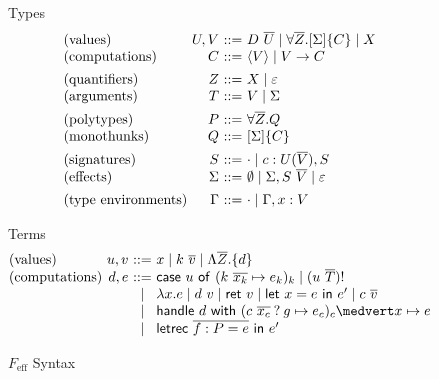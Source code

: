 \documentclass[preprint]{sigplanconf}
\makeatletter
\newcommand{\feff}{$F_\textrm{eff}$\xspace}
\newcommand{\many}{\overline}
\newcommand\ba{\begin{array}}
\newcommand\ea{\end{array}}
\newenvironment{equations}{\[\ba{@{}r@{~}c@{~}l@{}}}{\ea\]}
\newenvironment{syntax}{\[\ba{@{}l@{~}r@{~}c@{~}l@{}}}{\ea\]}
\newcommand{\rt}[1]{\langle{#1}\rangle}   %
\newcommand{\sig}{S}
\newcommand{\sigs}{\Sigma}
\newcommand{\effbox}[1]{[#1]}
\newcommand{\key}[1]{\mathsf{#1}}
\newcommand{\handleSymbol}{\mathbin{?}}
\newcommand{\handle}[2]{{#1} \handleSymbol {#2}}
\newcommand{\thunk}[1]{\{{#1}\}}
\newcommand{\force}[1]{{#1}!}
\newcommand\slab[1]{(\textrm{#1})}
\makeatother
\begin{document}
\begin{figure}
Types
\begin{syntax}
\slab{values}       &U, V   &::=& D~\many{U} \mid \forall \many{Z}.\effbox{\sigs}\thunk{C} \mid X \\ %
\slab{computations} &C      &::=& \rt{V} \mid V \to C  %
\\[1ex]
\slab{quantifiers}  &Z      &::=& X \mid \varepsilon \\
\slab{arguments}    &T      &::=& V \mid \sigs
\\[1ex]
\slab{polytypes}    &P      &::=& \forall \many{Z}.Q \\
\slab{monothunks}   &Q      &::=& \effbox{\sigs}\thunk{C}
\\[1ex]
\slab{signatures}   &\sig   &::=& \cdot \mid c : U(\many{V}), \sig \\
\slab{effects}      &\sigs  &::=&
  \emptyset \mid \sigs, \sig~\many{V} \mid \varepsilon
\\[1ex]
\slab{type environments}     &\Gamma &::=& \cdot \mid \Gamma, x:V \\
\end{syntax}


Terms
\begin{syntax}
\slab{values}       &u, v &::=& x \mid k~\many{v} \mid \Lambda \many{Z}.\thunk{d} \\
\slab{computations} &d, e &::=& \key{case}~u~\key{of}~
                                   (k~\many{x_k} \mapsto e_k)_k
                                \mid \force{(u~\many{T})} \\
                    &     &\mid& \lambda x.e \mid d~v 
                           \mid \key{ret}~v \mid \key{let}~x=e~\key{in}~e'
                           \mid c~\many{v} \\
                         &&\mid& \key{handle} ~d~ \key{with}~
                                   (\handle{c~\many{x_c}}{g} \mapsto e_c)_c \medvert
                                   x        \mapsto e \\
                         &&\mid& \key{letrec}~\many{f : P = e}~\key{in}~e' \\
\end{syntax}
\caption{\feff Syntax}
\label{fig:feff-syntax}
\end{figure}
\end{document}
